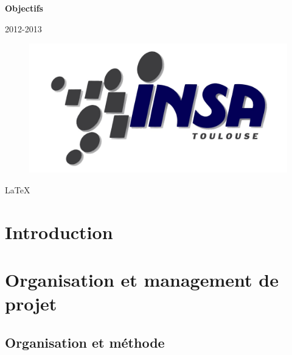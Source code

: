 \documentclass[a4paper]{report}
\begin{document}
\begin{titlepage}
\vfill {\bf Objectifs}\medskip \\
  
\vspace{50px}


\begin{center}
2012-2013
\end{center}
\begin{figure}[!h]
    \centering
    \includegraphics[scale=0.45]{logoINSA.jpg}
\end{figure}


\begin{center}
\LaTeX
\end{center}

\end{titlepage}


\tableofcontents

\newpage

\chapter*{Introduction} 

\newpage


\chapter{Organisation et management de projet}

\section{Organisation et méthode}

\end{document}
